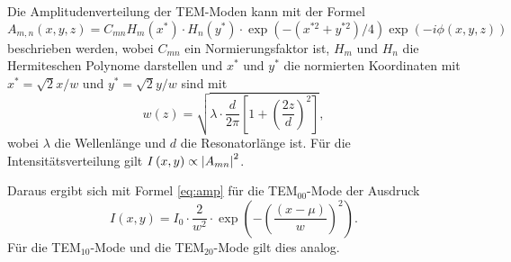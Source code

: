 Die Amplitudenverteilung der TEM-Moden kann mit der Formel 
\begin{equation}
    A_{m,n}\left(x,y,z\right) = C_{mn} H_m\left(x^*\right)\cdot H_n\left(y^*\right) \cdot \exp\left(-\left( x^{*2} + y^{*2} \right)/4 \right) \exp\left( -i \phi \left( x,y,z \right)\right) 
    \label{eq:amp}
\end{equation}
beschrieben werden, wobei $C_{mn}$ ein Normierungsfaktor ist, $H_m$ und $H_n$ die Hermiteschen Polynome darstellen und $x^*$ und $y^*$ die normierten Koordinaten mit $x^*= \sqrt{2} x/w$ und  $y^*= \sqrt{2} y/w$ sind mit 
\begin{equation*}
    w(z) = \sqrt{\lambda \cdot \frac{d}{2\pi}\left[ 1 + \left(\frac{2z}{d} \right)^2 \right]},
\end{equation*}
wobei $\lambda$ die Wellenlänge und $d$ die Resonatorlänge ist. Für die Intensitätsverteilung gilt $I\left(x,y\right) \propto \absolutevalue{A_{mn}}^2$. \cite{Laserspektroskopie}

Daraus ergibt sich mit Formel \eqref{eq:amp} für die 
TEM$_{00}$-Mode der Ausdruck 
\begin{equation}
    I(x,y) = I_0 \cdot \frac{2}{w^2} \cdot \exp\left(-\left(\frac{(x - \mu)}{w}\right)^2\right).
    \label{eq:mode0}
\end{equation}
Für die TEM$_{10}$-Mode und die TEM$_{20}$-Mode gilt dies analog.










